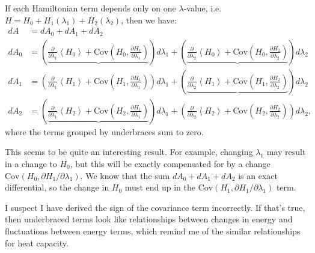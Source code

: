 \documentclass[%
 preprint,
 amsmath,amssymb,
 aps,
]{revtex4-1}
\begin{document}
If each Hamiltonian term depends only on one $\lambda$-value, i.e. $H = H_0 + H_1(\lambda_1) + H_2(\lambda_2)$, then we have:
\begin{align}
dA &= dA_0 + dA_1 + dA_2 \\
dA_0 &=
\left( \underbrace{
	\frac{\partial}{\partial \lambda_1}
    	\left<H_0\right> +
    \mathrm{Cov}\left(H_0,
    	\frac{\partial H_1}{\partial \lambda_1}
    \right)
} \right) d\lambda_1 +
\left( \underbrace{
	\frac{\partial}{\partial \lambda_2}
    	\left<H_0\right> +
    \mathrm{Cov}\left(H_0,
    	\frac{\partial H_2}{\partial \lambda_2}
    \right)
} \right) d\lambda_2 \\
dA_1 &=
\left(
	\frac{\partial}{\partial \lambda_1}
    	\left<H_1\right> +
    \mathrm{Cov}\left(H_1,
    	\frac{\partial H_1}{\partial \lambda_1}
    \right)
\right) d\lambda_1 +
\left(\underbrace{
	\frac{\partial}{\partial \lambda_2}
    	\left<H_1\right> +
    \mathrm{Cov}\left(H_1,
    	\frac{\partial H_2}{\partial \lambda_2}
    \right)
}\right) d\lambda_2 \\
dA_2 &=
\left(\underbrace{
	\frac{\partial}{\partial \lambda_1}
    	\left<H_2\right> +
    \mathrm{Cov}\left(H_2,
    	\frac{\partial H_1}{\partial \lambda_1}
    \right)
}\right) d\lambda_1 +
\left(
	\frac{\partial}{\partial \lambda_2}
    	\left<H_2\right> +
    \mathrm{Cov}\left(H_2,
    	\frac{\partial H_2}{\partial \lambda_2}
    \right)
\right) d\lambda_2,
\end{align}
where the terms grouped by underbraces sum to zero.

This seems to be quite an interesting result. For example, changing $\lambda_1$ may result in a change to $H_0$, but this will be exactly compensated for by a change $\mathrm{Cov}(H_0, \partial H_1 / \partial \lambda_1)$. We know that the sum $dA_0 + dA_1 + dA_2$ is an exact differential, so the change in $H_0$ must end up in the $\mathrm{Cov}(H_1, \partial H_1 / \partial \lambda_1)$ term.

I suspect I have derived the sign of the covariance term incorrectly. If that's true, then underbraced terms look like relationships between changes in energy and fluctuations between energy terms, which remind me of the similar relationships for heat capacity.
\end{document}
